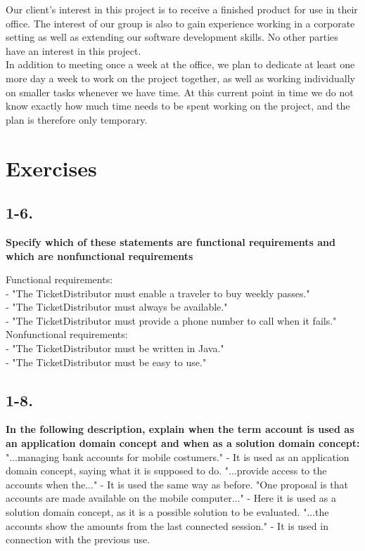 \documentclass[12pt]{article}
\begin{document}
Our client's interest in this project is to receive a finished product for use in their office. The interest of our group is also to gain experience working in a corporate setting as well as extending our software development skills. No other parties have an interest in this project.\\

In addition to meeting once a week at the office, we plan to dedicate at least one more day a week to work on the project together, as well as working individually on smaller tasks whenever we have time. At this current point in time we do not know exactly how much time needs to be spent working on the project, and the plan is therefore only temporary.










\newpage
\section{Exercises}

\subsection{1-6.}
\textbf{Specify which of these statements are functional requirements and which are
nonfunctional requirements}

Functional requirements:\\
- "The TicketDistributor must enable a traveler to buy weekly passes."\\
- "The TicketDistributor must always be available."\\
- "The TicketDistributor must provide a phone number to call when it fails."\\

Nonfunctional requirements:\\
- "The TicketDistributor must be written in Java."\\
- "The TicketDistributor must be easy to use."\\



\subsection{1-8.}
\textbf{In the following description, explain when the term account is used as an application domain concept and when as a solution domain concept:}\\
"...managing bank accounts for mobile costumers." - It is used as an application domain concept, saying what it is supposed to do. 
"...provide access to the accounts when the..." - It is used the same way as before. 
"One proposal is that accounts are made available on the mobile computer..." - Here it is used as a solution domain concept, as it is a possible solution to be evaluated. 
"...the accounts show the amounts from the last connected session." - It is used in connection with the previous use.\\
\end{document}

